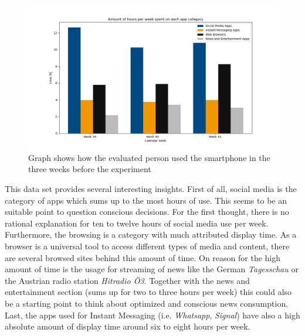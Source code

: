 \begin{figure}[h]
\centering
\includegraphics[width = \textwidth]{../data/usage-times.png}
\caption{Graph shows how the evaluated person used the smartphone in the three weeks before the experiment}
\end{figure}

This data set provides several interesting insights. First of all, social media is the category of apps which sums up to the most hours of use. This seems to be an suitable point to question conscious decisions. For the first thought, there is no rational explanation for ten to twelve hours of social media use per week. Furthermore, the browsing is a category with much attributed display time. As a browser is a universal tool to access different types of media and content, there are several browsed sites behind this amount of time. On reason for the high amount of time is the usage for streaming of news like the German \textit{Tagesschau} or the Austrian radio station \textit{Hitradio Ö3}. Together with the news and entertainment section (sums up for two to three hours per week) this could also be a starting point to think about optimized and conscious news consumption. Last, the apps used for Instant Messaging (i.e. \textit{Whatsapp}, \textit{Signal}) have also a high absolute amount of display time around six to eight hours per week.

